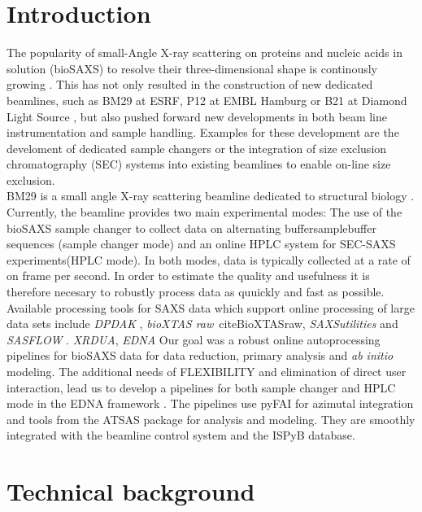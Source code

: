 \documentclass[preprint,pdf]{iucr}              %
\begin{document}
\section{Introduction}
The popularity of small-Angle X-ray scattering on proteins and nucleic acids in solution (bioSAXS) to resolve their three-dimensional shape is continously growing \cite{Graewert2013,Hura2009,Reyes2014}. This has not only resulted in the construction of new dedicated beamlines, such as BM29 at ESRF, P12 at EMBL Hamburg or B21 at Diamond Light Source \cite{BM29paper,P12,B21},  but also pushed forward new  developments in both beam line instrumentation and sample handling. Examples for these development are the develoment of dedicated sample changers \cite{SCPaper} or the integration of size exclusion chromatography (SEC) systems into existing beamlines to enable on-line size exclusion\cite{SECPaper2012}.\\
BM29 is a small angle X-ray scattering beamline dedicated to structural biology \cite{BM29paper}. Currently, the beamline provides two main experimental modes: The use of the bioSAXS sample changer  to collect data on  alternating buffer\/sample\/buffer sequences (sample changer mode)  and an online HPLC system for SEC-SAXS experiments(HPLC mode).
In both modes, data is typically collected at a rate of on frame per second. In order to estimate the quality and usefulness it is therefore necesary to robustly process data as quuickly and fast as possible.\\

Available processing tools for SAXS data which support online processing of large data sets include \textit{DPDAK} \cite{DPDAK}, \textit{bioXTAS raw}\ cite{BioXTASraw}, \textit{SAXSutilities} \cite{SAXSUtilities} and \textit{SASFLOW} \cite{X33P,P12}.  \textit{XRDUA}, \textit{EDNA}
Our goal was a robust online autoprocessing pipelines for bioSAXS data for data reduction, primary analysis and \textit{ab initio} modeling. The additional needs of FLEXIBILITY and elimination of direct user interaction, lead us to develop a pipelines for both sample changer and HPLC mode in the EDNA framework \cite{edna}. The pipelines use pyFAI for azimutal integration \cite{pyFAI} and tools from the ATSAS package \cite{ATSAS1,ATSAS2} for analysis and modeling. They are smoothly integrated with the beamline control system and the ISPyB database. 

\section{Technical background}
\end{document}
